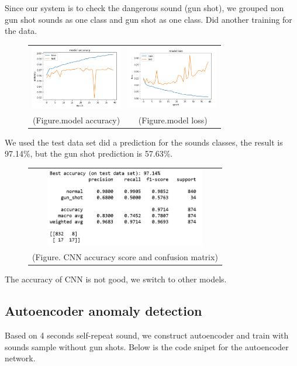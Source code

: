 \documentclass{article}
\begin{document}
Since our system is to check the dangerous sound (gun shot), we grouped non gun shot sounds as one class and gun shot as one class. Did another training for the data.
\begin{figure}[!htb]
    \begin{tabular}{cc}
        \includegraphics[width=4cm]{pic/CNN_ACC_V2.PNG}
        &\includegraphics[width=4cm]{pic/CNN_Loss_V2.PNG}\\
    (Figure.model accuracy)&(Figure.model loss)
    \end{tabular}
\end{figure}
We used the test data set did a prediction for the sounds classes, the result is 97.14\%, but the gun shot prediction is 57.63\%.
\begin{figure}[!htb]
    \begin{tabular}{c}
        \includegraphics[width=7cm]{pic/CNN_Pm_V2.PNG}\\
    (Figure. CNN accuracy score and confusion matrix)
    \end{tabular}
\end{figure}
The accuracy of CNN is not good, we switch to other models.

\subsection{Autoencoder anomaly detection}
Based on 4 seconds self-repeat sound, we construct autoencoder and train with sounds sample without gun shots. Below is the code snipet for the autoencoder network.
\end{document}
